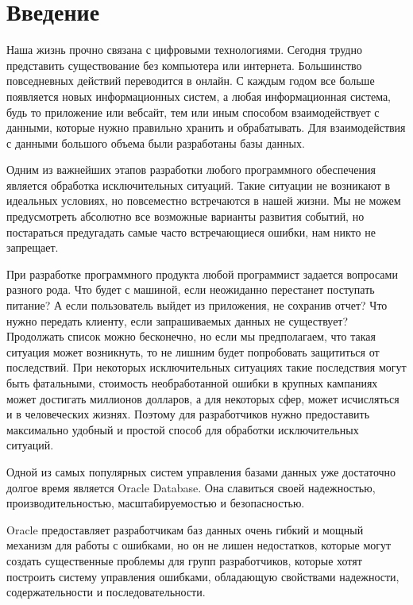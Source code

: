\chapter*{Введение} %

Наша жизнь прочно связана с цифровыми технологиями. Сегодня трудно представить существование без компьютера или интернета. Большинство повседневных действий переводится в онлайн. С каждым годом все больше появляется новых информационных систем, а любая информационная система, будь то приложение или вебсайт, тем или иным способом взаимодействует с данными, которые нужно правильно хранить и обрабатывать. Для взаимодействия с данными большого объема были разработаны базы данных. 

Одним из важнейших этапов разработки любого программного обеспечения является обработка исключительных ситуаций. Такие ситуации не возникают в идеальных условиях, но повсеместно встречаются в нашей жизни. Мы не можем предусмотреть абсолютно все возможные варианты развития событий, но постараться предугадать самые часто встречающиеся ошибки, нам никто не запрещает. 

При разработке программного продукта любой программист задается вопросами разного рода. Что будет с машиной, если неожиданно перестанет поступать питание? А если пользователь выйдет из приложения, не сохранив отчет? Что нужно передать клиенту, если запрашиваемых данных не существует? Продолжать список можно бесконечно, но если мы предполагаем, что такая ситуация может возникнуть, то не лишним будет попробовать защититься от последствий. При некоторых исключительных ситуациях такие последствия могут быть фатальными, стоимость необработанной ошибки в крупных кампаниях может достигать миллионов долларов, а для некоторых сфер, может исчисляться и в человеческих жизнях. Поэтому для разработчиков нужно предоставить максимально удобный и простой способ для обработки исключительных ситуаций. 

Одной из самых популярных систем управления базами данных уже достаточно долгое время является Oracle Database. Она славиться своей надежностью, производительностью, масштабируемостью и безопасностью.

Oracle предоставляет разработчикам баз данных очень гибкий и мощный механизм для работы с ошибками, но он не лишен недостатков, которые могут создать существенные проблемы для групп разработчиков, которые хотят построить систему управления ошибками, обладающую свойствами надежности, содержательности и последовательности.

